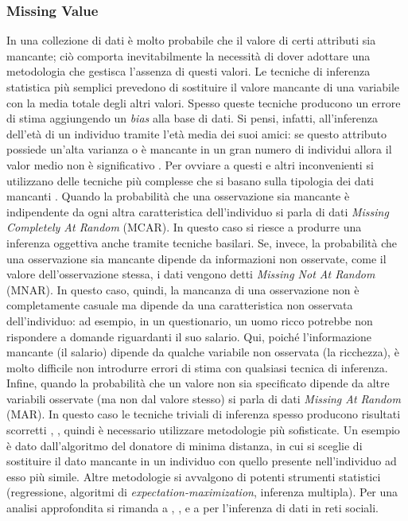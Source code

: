 \subsubsection{Missing Value}
In una collezione di dati \`e molto probabile che il valore di certi attributi sia mancante; ci\`o comporta inevitabilmente la necessit\`a di dover adottare una metodologia che gestisca l'assenza di questi valori. Le tecniche di inferenza statistica pi\`u semplici prevedono di sostituire il valore mancante di una variabile con la media totale degli altri valori. Spesso queste tecniche producono un errore di stima aggiungendo un \textit{bias} alla base di dati. Si pensi, infatti, all'inferenza dell'et\`a di un individuo tramite l'et\`a media dei suoi amici: se questo attributo possiede un'alta varianza o \`e mancante in un gran numero di individui allora il valor medio non \`e significativo \cite{rubin1987}. Per ovviare a questi e altri inconvenienti si utilizzano delle tecniche pi\`u complesse che si basano sulla tipologia dei dati mancanti \cite{Donders2006}. Quando la probabilit\`a che una osservazione sia mancante \`e indipendente da ogni altra caratteristica dell'individuo si parla di dati \textit{Missing Completely At Random} (MCAR). In questo caso si riesce a produrre una inferenza oggettiva anche tramite tecniche basilari. Se, invece, la probabilit\`a che una osservazione sia mancante dipende da informazioni non osservate, come il valore dell'osservazione stessa, i dati vengono detti \textit{Missing Not At Random} (MNAR). In questo caso, quindi, la mancanza di una osservazione non \`e completamente casuale ma  dipende da una caratteristica non osservata dell'individuo: ad esempio, in un questionario, un uomo ricco potrebbe non rispondere a domande riguardanti il suo salario. Qui, poich\'e l'informazione mancante (il salario) dipende da qualche variabile non osservata (la ricchezza), \`e molto difficile non introdurre errori di stima con qualsiasi tecnica di inferenza. Infine, quando la probabilit\`a che un valore non sia specificato dipende da altre variabili osservate (ma non dal valore stesso) si parla di dati \textit{Missing At Random} (MAR). In questo caso le tecniche triviali di inferenza spesso producono risultati scorretti \cite{Greenland1995}, \cite{Vach1994}, quindi \`e necessario utilizzare metodologie pi\`u sofisticate. Un esempio \`e dato dall'algoritmo del donatore di minima distanza, in cui si sceglie di sostituire il dato mancante in un individuo con quello presente nell'individuo ad esso pi\`u simile.
Altre metodologie si avvalgono di potenti strumenti statistici (regressione, algoritmi di \textit{expectation-maximization}, inferenza multipla). Per una analisi approfondita si rimanda a \cite{Little1986}, \cite{Schafer1997}, \cite{rubin1987} e a \cite{Kossinets2003} per l'inferenza di dati in reti sociali.


